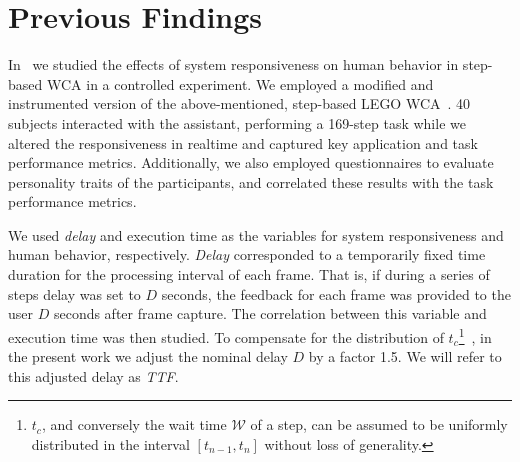 \section{Previous Findings}

In~\cite{olguinmunoz2021impact} we studied the effects of system responsiveness on human behavior in step-based \ac{WCA} in a controlled experiment.
We employed a modified and instrumented version of the above-mentioned, step-based LEGO \ac{WCA}~\cite{chen2015early}.
\num{40} subjects interacted with the assistant, performing a \num{169}-step task while we altered the responsiveness in realtime and captured key application and task performance metrics.
Additionally, we also employed questionnaires to evaluate personality traits of the participants, and correlated these results with the task performance metrics.

We used \emph{delay} and execution time as the variables for system responsiveness and human behavior, respectively.
\emph{Delay} corresponded to a temporarily fixed time duration for the processing interval of each frame.
That is, if during a series of steps delay was set to \( D \) seconds, the feedback for each frame was provided to the user \( D \) seconds after frame capture.
The correlation between this variable and execution time was then studied.
To compensate for the distribution of \( t_c \)\footnote{\( t_c \), and conversely the wait time \( \mathcal{W} \) of a step, can be assumed to be uniformly distributed in the interval \( [t_{n - 1}, t_n] \) without loss of generality.}~\cite{olguinmunoz2021impact}, in the present work we adjust the nominal delay \( D \) by a factor \num{1.5}.
We will refer to this adjusted delay as \emph{\acf{TTF}}.



